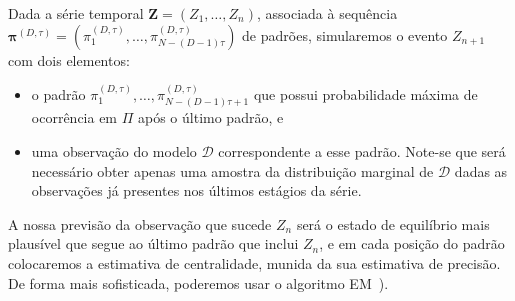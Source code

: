 \documentclass[10pt]{article}
\begin{document}
Dada a série temporal $\bm Z=(Z_1,\dots,Z_n)$, associada à sequência $\bm \pi^{(D,\tau)} = (\pi^{(D,\tau)}_1,\dots,\pi^{(D,\tau)}_{N-(D-1)\tau})$ de padrões, simularemos o evento $Z_{n+1}$ com dois elementos:
\begin{itemize}
	\item o padrão $\pi^{(D,\tau)}_1,\dots,\pi^{(D,\tau)}_{N-(D-1)\tau+1}$ que possui probabilidade máxima de ocorrência em $\Pi$ após o último padrão, e
	\item uma observação do modelo $\mathcal D$ correspondente a esse padrão. Note-se que será necessário obter apenas uma amostra da distribuição marginal de $\mathcal D$ dadas as observações já presentes nos últimos estágios da série.
\end{itemize} 

A nossa previsão da observação que sucede $Z_n$ será o estado de equilíbrio mais plausível que segue ao último padrão que inclui $Z_n$, e em cada posição do padrão colocaremos a estimativa de centralidade, munida da sua estimativa de precisão.
De forma mais sofisticada, poderemos usar o algoritmo EM~\citep{dempster_em}).



\end{document}
